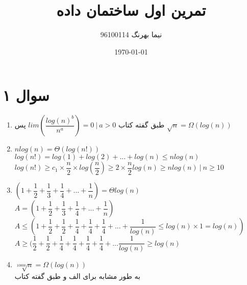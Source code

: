 \documentclass[a4paper]{article}
\title{تمرین اول ساختمان داده}
\author{نیما بهرنگ 96100114}
\date{\today}
\begin{document}
\maketitle
{}
\section*{سوال ۱}
\begin{enumerate}
\item{}
طبق گفته کتاب
$lim(\dfrac{log(n)^b}{n^a}) = 0 \:  | \:  a > 0$
پس
$\sqrt{n} = \Omega(log(n))$
\item{}
$nlog(n) = \Theta(log(n!))$
\\
$log(n!) = log(1) + log(2) + ... + log(n) \leq nlog(n)$
\\
$log(n!) \geq c_1 \times \dfrac{n}{2} \times log(\dfrac{n}{2}) \geq 2 \times \dfrac{n}{2}log(n) \geq nlog(n) \: | \: n \geq 10$

\item{}
$(1 + \dfrac{1}{2} + \dfrac{1}{3} + \dfrac{1}{4} + ... + \dfrac{1}{n}) = \Theta log(n)$
\\
$A = (1 + \dfrac{1}{2} + \dfrac{1}{3} + \dfrac{1}{4} + ... + \dfrac{1}{n})$
\\
$A \leq (1 + \dfrac{1}{2} + \dfrac{1}{2} + \dfrac{1}{4} + \dfrac{1}{4} + \dfrac{1}{4} + ... + \dfrac{1}{log(n)} \leq log(n) \times 1 = log(n)) $
\\
$A \geq (\dfrac{1}{2} + \dfrac{1}{2} + \dfrac{1}{4} + \dfrac{1}{4} + \dfrac{1}{4} + \dfrac{1}{4} + ... \dfrac{1}{log(n)} \geq log(n)$

\item{}
$\sqrt[10000]{n} = \Omega(log(n))$
\\
به طور مشابه برای الف و طبق گفته کتاب
\end{enumerate}
\newpage
\end{document}
